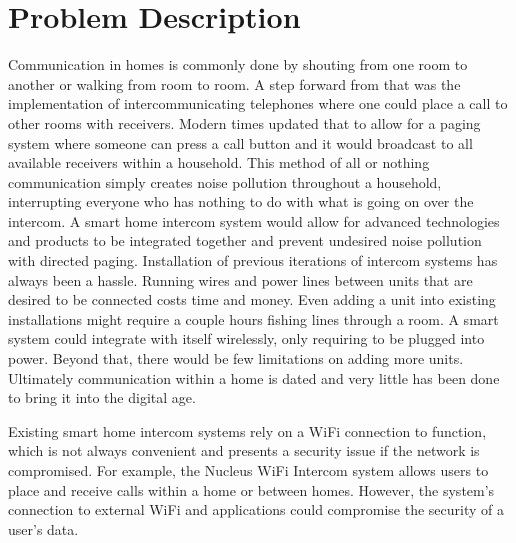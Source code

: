 \documentclass[onecolumn, draftclsnofoot,10pt, compsoc]{IEEEtran}
\begin{document}
\section{Problem Description}
Communication in homes is commonly done by shouting from one room to another or walking from room to room. A step forward from that was the implementation of intercommunicating telephones where one could place a call to other rooms with receivers. Modern times updated that to allow for a paging system where someone can press a call button and it would broadcast to all available receivers within a household. This method of all or nothing communication simply creates noise pollution throughout a household, interrupting everyone who has nothing to do with what is going on over the intercom. A smart home intercom system would allow for advanced technologies and products to be integrated together and prevent undesired noise pollution with directed paging. Installation of previous iterations of intercom systems has always been a hassle. Running wires and power lines between units that are desired to be connected costs time and money. Even adding a unit into existing installations might require a couple hours fishing lines through a room. A smart system could integrate with itself wirelessly, only requiring to be plugged into power. Beyond that, there would be few limitations on adding more units. Ultimately communication within a home is dated and very little has been done to bring it into the digital age.

Existing smart home intercom systems rely on a WiFi connection to function, which is not always convenient and presents a security issue if the network is compromised. For example, the Nucleus WiFi Intercom system allows users to place and receive calls within a home or between homes. However, the system’s connection to external WiFi and applications could compromise the security of a user's data.  
\end{document}
